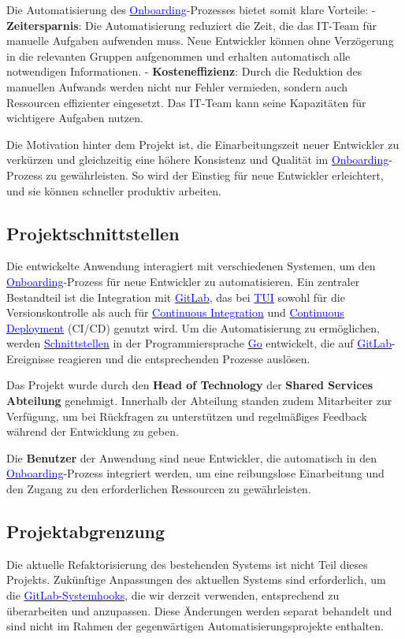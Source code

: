Die Automatisierung des \hyperlink{Onboarding}{\textcolor{blue}{Onboarding}}-Prozesses bietet somit klare Vorteile:
- \textbf{Zeitersparnis}: Die Automatisierung reduziert die Zeit, die das IT-Team für manuelle Aufgaben aufwenden muss. Neue Entwickler können ohne Verzögerung in die relevanten Gruppen aufgenommen und erhalten automatisch alle notwendigen Informationen.
- \textbf{Kosteneffizienz}: Durch die Reduktion des manuellen Aufwands werden nicht nur Fehler vermieden, sondern auch Ressourcen effizienter eingesetzt. Das IT-Team kann seine Kapazitäten für wichtigere Aufgaben nutzen.

Die Motivation hinter dem Projekt ist, die Einarbeitungszeit neuer Entwickler zu verkürzen und gleichzeitig eine höhere Konsistenz und Qualität im \hyperlink{Onboarding}{\textcolor{blue}{Onboarding}}-Prozess zu gewährleisten. So wird der Einstieg für neue Entwickler erleichtert, und sie können schneller produktiv arbeiten. 

\subsection{Projektschnittstellen} 
\label{sec:Projektschnittstellen}

Die entwickelte Anwendung interagiert mit verschiedenen Systemen, um den \hyperlink{Onboarding}{\textcolor{blue}{Onboarding}}-Prozess für neue Entwickler zu automatisieren. Ein zentraler Bestandteil ist die Integration mit \hyperlink{GitLab}{\textcolor{blue}{GitLab}}, das bei \hyperlink{TUI}{\textcolor{blue}{TUI}} sowohl für die Versionskontrolle als auch für \hyperlink{CI}{\textcolor{blue}{Continuous Integration}} und \hyperlink{CD}{\textcolor{blue}{Continuous Deployment}} (CI/CD) genutzt wird. Um die Automatisierung zu ermöglichen, werden \hyperlink{Schnittstelle}{\textcolor{blue}{Schnittstellen}} in der Programmiersprache \hyperlink{Go}{\textcolor{blue}{Go}} entwickelt, die auf \hyperlink{GitLab}{\textcolor{blue}{GitLab}}-Ereignisse reagieren und die entsprechenden Prozesse auslösen.

Das Projekt wurde durch den \textbf{Head of Technology} der \textbf{Shared Services Abteilung} genehmigt. Innerhalb der Abteilung standen zudem Mitarbeiter zur Verfügung, um bei Rückfragen zu unterstützen und regelmäßiges Feedback während der Entwicklung zu geben.

Die \textbf{Benutzer} der Anwendung sind neue Entwickler, die automatisch in den \hyperlink{Onboarding}{\textcolor{blue}{Onboarding}}-Prozess integriert werden, um eine reibungslose Einarbeitung und den Zugang zu den erforderlichen Ressourcen zu gewährleisten.

\subsection{Projektabgrenzung} 
\label{sec:Projektabgrenzung}

Die aktuelle Refaktorisierung des bestehenden Systems ist nicht Teil dieses Projekts. Zukünftige Anpassungen des aktuellen Systems sind erforderlich, um die \hyperlink{GitLabSystemhooks}{\textcolor{blue}{GitLab-Systemhooks}}, die wir derzeit verwenden, entsprechend zu überarbeiten und anzupassen. Diese Änderungen werden separat behandelt und sind nicht im Rahmen der gegenwärtigen Automatisierungsprojekte enthalten.
